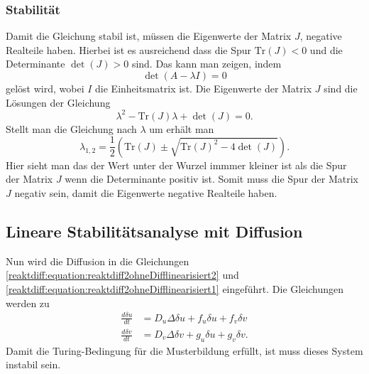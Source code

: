 \subsubsection{Stabilität}
Damit die Gleichung stabil ist, müssen die Eigenwerte der Matrix \(J\), negative Realteile haben.
Hierbei ist es ausreichend dass die Spur \(\text{Tr}(J) < 0\) und die Determinante \(\det(J) > 0\) sind.
Das kann man zeigen, indem
\begin{equation*}
    \det(A - \lambda I) = 0
\end{equation*}
gelöst wird, wobei \(I\) die Einheitsmatrix ist.
Die Eigenwerte der Matrix \(J\) sind die Lösungen der Gleichung
\begin{equation*}
    \lambda^2 - \text{Tr}(J) \lambda + \det(J) = 0.
\label{reaktdiff:equation:reaktdiff2ohneDifflinearisiert3}
\end{equation*}
Stellt man die Gleichung nach \(\lambda\) um erhält man
\begin{equation*}
    \lambda_{1,2} = \frac{1}{2} \left( \text{Tr}(J) \pm 
    \sqrt{\text{Tr}(J)^2 - 4 \det(J)} \right).
\label{reaktdiff:equation:reaktdiff2ohneDifflinearisiert4}
\end{equation*}
Hier sieht man das der Wert unter der Wurzel immmer kleiner ist als die Spur der Matrix \(J\) wenn die Determinante positiv ist.
Somit muss die Spur der Matrix \(J\) negativ sein, damit die Eigenwerte negative Realteile haben.

\subsection{Lineare Stabilitätsanalyse mit Diffusion
\label{reaktdiff:section:matheDiff}}
Nun wird die Diffusion in die Gleichungen \eqref{reaktdiff:equation:reaktdiff2ohneDifflinearisiert2} und \eqref{reaktdiff:equation:reaktdiff2ohneDifflinearisiert1} eingeführt.
Die Gleichungen werden zu
\begin{align}
    \label{reaktdiff:equation:reaktdiff2mitDiff1}
    \frac{d \delta u}{dt} &= D_u \Delta \delta u + 
    f_u \delta u + f_v \delta v\\
    \label{reaktdiff:equation:reaktdiff2mitDiff2}
    \frac{d \delta v}{dt} &= D_v \Delta \delta v + 
    g_u \delta u + g_v \delta v.
\end{align}
Damit die Turing-Bedingung für die Musterbildung erfüllt, ist muss dieses System instabil sein.

